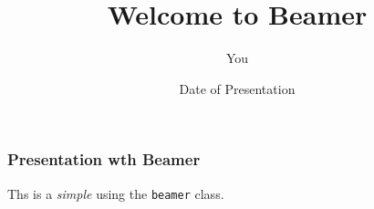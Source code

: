 \documentclass{beamer}
\title{Welcome to Beamer}
\author{You}
\institute{Where You're From}
\date{Date of Presentation}
\begin{document}
\begin{frame}
    \frametitle{Presentation wth Beamer}

Ths is a \textit{simple} \textbf{} using the \texttt{beamer} class.
\titlepage %
\end{frame}
\end{document}
